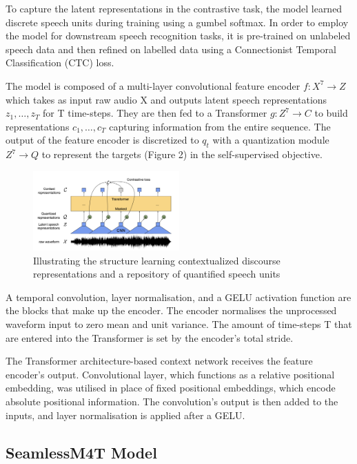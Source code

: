 \documentclass[conference]{IEEEtran}
\begin{document}
To capture the latent representations in the contrastive task, the model learned discrete speech units during training using a gumbel softmax. In order to employ the model for downstream speech recognition tasks, it is pre-trained on unlabeled speech data and then refined on labelled data using a Connectionist Temporal Classification (CTC) loss.

The model is composed of a multi-layer convolutional feature encoder \( f : X^7 \rightarrow Z \) which takes as input raw audio X and outputs latent speech representations \( z_1, \ldots, z_T \) for T time-steps. They are then fed to a Transformer \( g:Z^7 \rightarrow C \) to build representations \(c_1,\ldots,c_T\) capturing information from the entire sequence. The output of the feature encoder is discretized to \(q_t\) with a quantization module \( Z^7 \rightarrow Q \) to represent the targets (Figure 2) in the self-supervised objective.

\begin{figure}[ht]
\centering
\includegraphics[width=0.5\textwidth]{15.png}
\caption{Illustrating the structure learning contextualized discourse representations and a repository of quantified speech units}
\label{fig:whisper_asr_architecture}
\end{figure}

A temporal convolution, layer normalisation, and a GELU activation function are the blocks that make up the encoder. The encoder normalises the unprocessed waveform input to zero mean and unit variance. The amount of time-steps T that are entered into the Transformer is set by the encoder's total stride.

The Transformer architecture-based context network receives the feature encoder's output. Convolutional layer, which functions as a relative positional embedding, was utilised in place of fixed positional embeddings, which encode absolute positional information. The convolution's output is then added to the inputs, and layer normalisation is applied after a GELU. \cite{baevski2020}

\subsection{SeamlessM4T Model}
\end{document}
